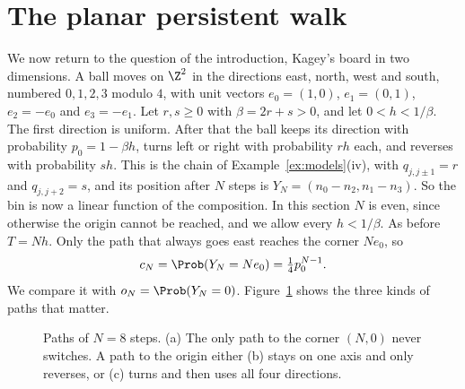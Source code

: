 \section{The planar persistent walk}\label{sec:planar}

We now return to the question of the introduction, Kagey's board in two
dimensions. A ball moves on $\Z^2$ in the directions east, north, west and
south, numbered $0,1,2,3$ modulo $4$, with unit vectors $e_0=(1,0)$, $e_1=(0,1)$,
$e_2=-e_0$ and $e_3=-e_1$. Let $r,s\ge0$ with $\beta=2r+s>0$, and let
$0<h<1/\beta$. The first direction is uniform. After that the ball keeps its
direction with probability $p_0=1-\beta h$, turns left or right with
probability $rh$ each, and reverses with probability $sh$. This is the chain of
Example~\ref{ex:models}(iv), with $q_{j,j\pm1}=r$ and $q_{j,j+2}=s$, and its
position after $N$ steps is $Y_N=(n_0-n_2,n_1-n_3)$. So the bin is now a linear
function of the composition. In this section $N$ is even, since otherwise the
origin cannot be reached, and we allow every $h<1/\beta$. As before $T=Nh$. Only
the path that always goes east reaches the corner $Ne_0$, so
\[
 c_N=\Prob(Y_N=Ne_0)=\tfrac14p_0^{N-1}.
\]
We compare it with $o_N=\Prob(Y_N=0)$. Figure~\ref{fig:planarpaths} shows the
three kinds of paths that matter.

\begin{figure}[t]
\centering
{}
\caption{Paths of $N=8$ steps. (a) The only path to the corner $(N,0)$ never
switches. A path to the origin either (b) stays on one axis and only reverses,
or (c) turns and then uses all four directions.}
\label{fig:planarpaths}
\end{figure}

